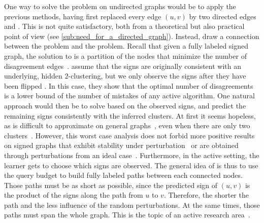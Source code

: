 One way to solve the problem on undirected graphs would be to apply the previous methods, having
first replaced every edge $(u,v)$ by two directed edges \euv{} and \evu{}. This is not quite
satisfactory, both from a theoretical but also practical point of view (see
\autoref{sub:need_for_a_directed_graph}). Instead, \textcite{Cesa-Bianchi2012b} draw a connection
between the \esp{} problem and the \pcc{} problem. Recall that given a fully labeled signed graph,
the solution to \pcc{} is a partition of the nodes that minimize the number of disagreement
edges~\autocite{Bansal2002}. \Textcite{Cesa-Bianchi2012b} assume that the signs are originally
consistent with an underlying, hidden $2$-clustering, but we only observe the signs after they have
been flipped \uar{}. In this case, they show that the optimal number of disagreements is a lower
bound of the number of mistakes of any active \esp{} algorithm. One natural approach would then be
to solve \pcc{} based on the observed signs, and predict the remaining signs consistently with the
inferred clusters. At first it seems hopeless, as \pcc{} is difficult to approximate on general
graphs~\autocite{Charikar2003}, even when there are only two clusters~\autocite{Giotis2006}.
However, this worst case analysis does not forbid more positive results on signed graphs that
exhibit stability under perturbation~\autocites{clusteringFeasibility15}{StableCC09}{StableLP09} or
are obtained through perturbations from an ideal case~\autocites{plantedAilon09}{Makarychev2014}.
Furthermore, in the active setting, the learner gets to choose which signs are observed. The general
idea of \textcite{Cesa-Bianchi2012b} is thus to use the query budget to build fully labeled paths
between each connected nodes. Those paths must be as short as possible, since the predicted sign of
$(u,v)$ is the product of the signs along the path from $u$ to $v$. Therefore, the shorter the path
and the less influence of the random perturbations. At the same times, those paths must span the
whole graph. This is the topic of an active research area~\autocites{Abraham2012}{Spanner17}.

